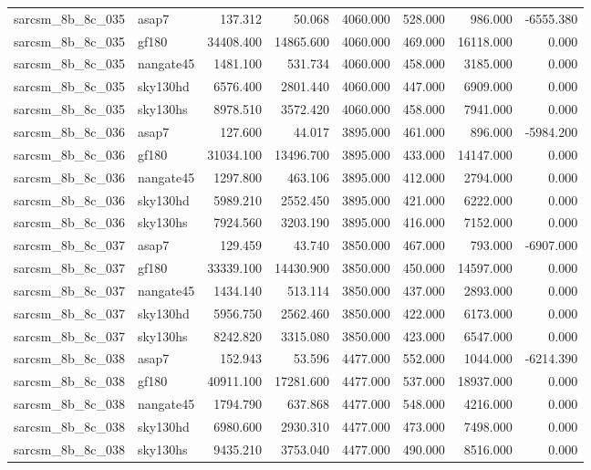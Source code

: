 \begin{tabular}{llrrrrrr}
sarcsm\_8b\_8c\_035 & asap7 & 137.312 & 50.068 & 4060.000 & 528.000 & 986.000 & -6555.380 \\
sarcsm\_8b\_8c\_035 & gf180 & 34408.400 & 14865.600 & 4060.000 & 469.000 & 16118.000 & 0.000 \\
sarcsm\_8b\_8c\_035 & nangate45 & 1481.100 & 531.734 & 4060.000 & 458.000 & 3185.000 & 0.000 \\
sarcsm\_8b\_8c\_035 & sky130hd & 6576.400 & 2801.440 & 4060.000 & 447.000 & 6909.000 & 0.000 \\
sarcsm\_8b\_8c\_035 & sky130hs & 8978.510 & 3572.420 & 4060.000 & 458.000 & 7941.000 & 0.000 \\
sarcsm\_8b\_8c\_036 & asap7 & 127.600 & 44.017 & 3895.000 & 461.000 & 896.000 & -5984.200 \\
sarcsm\_8b\_8c\_036 & gf180 & 31034.100 & 13496.700 & 3895.000 & 433.000 & 14147.000 & 0.000 \\
sarcsm\_8b\_8c\_036 & nangate45 & 1297.800 & 463.106 & 3895.000 & 412.000 & 2794.000 & 0.000 \\
sarcsm\_8b\_8c\_036 & sky130hd & 5989.210 & 2552.450 & 3895.000 & 421.000 & 6222.000 & 0.000 \\
sarcsm\_8b\_8c\_036 & sky130hs & 7924.560 & 3203.190 & 3895.000 & 416.000 & 7152.000 & 0.000 \\
sarcsm\_8b\_8c\_037 & asap7 & 129.459 & 43.740 & 3850.000 & 467.000 & 793.000 & -6907.000 \\
sarcsm\_8b\_8c\_037 & gf180 & 33339.100 & 14430.900 & 3850.000 & 450.000 & 14597.000 & 0.000 \\
sarcsm\_8b\_8c\_037 & nangate45 & 1434.140 & 513.114 & 3850.000 & 437.000 & 2893.000 & 0.000 \\
sarcsm\_8b\_8c\_037 & sky130hd & 5956.750 & 2562.460 & 3850.000 & 422.000 & 6173.000 & 0.000 \\
sarcsm\_8b\_8c\_037 & sky130hs & 8242.820 & 3315.080 & 3850.000 & 423.000 & 6547.000 & 0.000 \\
sarcsm\_8b\_8c\_038 & asap7 & 152.943 & 53.596 & 4477.000 & 552.000 & 1044.000 & -6214.390 \\
sarcsm\_8b\_8c\_038 & gf180 & 40911.100 & 17281.600 & 4477.000 & 537.000 & 18937.000 & 0.000 \\
sarcsm\_8b\_8c\_038 & nangate45 & 1794.790 & 637.868 & 4477.000 & 548.000 & 4216.000 & 0.000 \\
sarcsm\_8b\_8c\_038 & sky130hd & 6980.600 & 2930.310 & 4477.000 & 473.000 & 7498.000 & 0.000 \\
sarcsm\_8b\_8c\_038 & sky130hs & 9435.210 & 3753.040 & 4477.000 & 490.000 & 8516.000 & 0.000 \\

\end{tabular}
